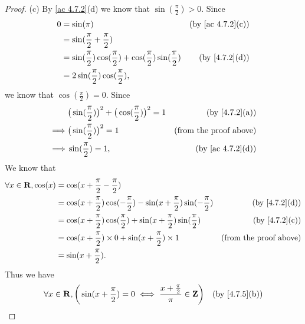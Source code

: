 \begin{proof}{(c)}
  By \cref{ac 4.7.2}(d) we know that \(\sin(\frac{\pi}{2}) > 0\).
  Since
  \begin{align*}
    0 & = \sin(\pi)                                                                         & \text{(by \cref{ac 4.7.2}(c))} \\
      & = \sin(\frac{\pi}{2} + \frac{\pi}{2})                                                                                \\
      & = \sin(\frac{\pi}{2}) \cos(\frac{\pi}{2}) + \cos(\frac{\pi}{2}) \sin(\frac{\pi}{2}) & \text{(by \cref{4.7.2}(d))}    \\
      & = 2 \sin(\frac{\pi}{2}) \cos(\frac{\pi}{2}),
  \end{align*}
  we know that \(\cos(\frac{\pi}{2}) = 0\).
  Since
  \begin{align*}
             & \big(\sin(\frac{\pi}{2})\big)^2 + \big(\cos(\frac{\pi}{2})\big)^2 = 1 & \text{(by \cref{4.7.2}(a))}    \\
    \implies & \big(\sin(\frac{\pi}{2})\big)^2 = 1                                   & \text{(from the proof above)}  \\
    \implies & \sin(\frac{\pi}{2}) = 1,                                              & \text{(by \cref{ac 4.7.2}(d))}
  \end{align*}
  We know that
  \begin{align*}
    \forall x \in \R, \cos(x) & = \cos(x + \frac{\pi}{2} - \frac{\pi}{2})                                                                                     \\
                              & = \cos(x + \frac{\pi}{2}) \cos(-\frac{\pi}{2}) - \sin(x + \frac{\pi}{2}) \sin(-\frac{\pi}{2}) & \text{(by \cref{4.7.2}(d))}   \\
                              & = \cos(x + \frac{\pi}{2}) \cos(\frac{\pi}{2}) + \sin(x + \frac{\pi}{2}) \sin(\frac{\pi}{2})   & \text{(by \cref{4.7.2}(c))}   \\
                              & = \cos(x + \frac{\pi}{2}) \times 0 + \sin(x + \frac{\pi}{2}) \times 1                         & \text{(from the proof above)} \\
                              & = \sin(x + \frac{\pi}{2}).
  \end{align*}
  Thus we have
  \begin{align*}
         & \forall x \in \R, \bigg(\sin(x + \frac{\pi}{2}) = 0 \iff \frac{x + \frac{\pi}{2}}{\pi} \in \Z\bigg)    & \text{(by \cref{4.7.5}(b))}   \\

\end{align*}
\end{proof}
